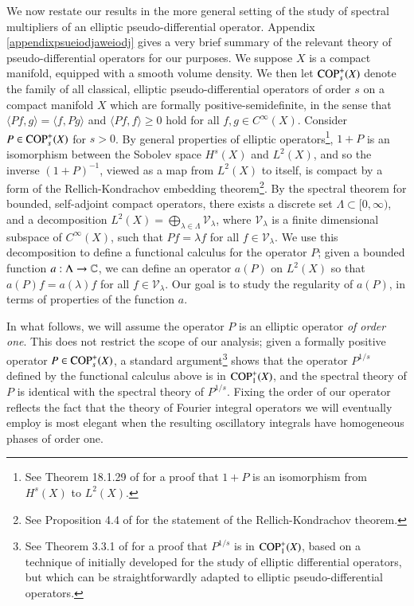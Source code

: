 We now restate our results in the more general setting of the study of spectral multipliers of an elliptic pseudo-differential operator. Appendix \ref{appendixpsueiodjaweiodj} gives a very brief summary of the relevant theory of pseudo-differential operators for our purposes. We suppose $X$ is a compact manifold, equipped with a smooth volume density. We then let ${\text{COP}^{+}_{{s}}}(X)$ denote the family of all classical, elliptic pseudo-differential operators of order $s$ on a compact manifold $X$ which are formally positive-semidefinite, in the sense that $\langle Pf, g \rangle = \langle f, Pg \rangle$ and $\langle Pf, f \rangle \geq 0$ hold for all $f,g \in C^\infty(X)$. Consider $P \in {\text{COP}^{+}_{{s}}}(X)$ for $s > 0$. By general properties of elliptic operators\footnote{See Theorem 18.1.29 of \cite{Hormander3} for a proof that $1 + P$ is an isomorphism from $H^s(X)$ to $L^2(X)$.}, $1 + P$ is an isomorphism between the Sobolev space $H^s(X)$ and $L^2(X)$,
%
%
and so the inverse $(1 + P)^{-1}$, viewed as a map from $L^2(X)$ to itself, is compact by a form of the Rellich-Kondrachov embedding theorem\footnote{See Proposition 4.4 of \cite{Taylor} for the statement of the Rellich-Kondrachov theorem.}. By the spectral theorem for bounded, self-adjoint compact operators, there exists a discrete set $\Lambda \subset [0,\infty)$, and a decomposition $L^2(X) = \bigoplus\nolimits_{\lambda \in \Lambda} \mathcal{V}_\lambda$, where $\mathcal{V}_\lambda$ is a finite dimensional subspace of $C^\infty(X)$, such that $Pf = \lambda f$ for all $f \in \mathcal{V}_\lambda$. We use this decomposition to define a functional calculus for the operator $P$; given a bounded function $a: \Lambda \to \operatorname{\mathbb{C}}$, we can define an operator $a(P)$ on $L^2(X)$ so that $a(P) f = a(\lambda) f$ for all $f \in \mathcal{V}_\lambda$. Our goal is to study the regularity of $a(P)$, in terms of properties of the function $a$.

In what follows, we will assume the operator $P$ is an elliptic operator \emph{of order one}. This does not restrict the scope of our analysis; given a formally positive operator $P \in {\text{COP}^{+}_{{s}}}(X)$, a standard argument\footnote{See Theorem 3.3.1 of \cite{Sogge} for a proof that $P^{1/s}$ is in ${\text{COP}^{+}_{{1}}}(X)$, based on a technique of \cite{Seeley} initially developed for the study of elliptic differential operators, but which can be straightforwardly adapted to elliptic pseudo-differential operators.} shows that the operator $P^{1/s}$ defined by the functional calculus above is in ${\text{COP}^{+}_{{1}}}(X)$, and the spectral theory of $P$ is identical with the spectral theory of $P^{1/s}$. Fixing the order of our operator reflects the fact that the theory of Fourier integral operators we will eventually employ is most elegant when the resulting oscillatory integrals have homogeneous phases of order one.

